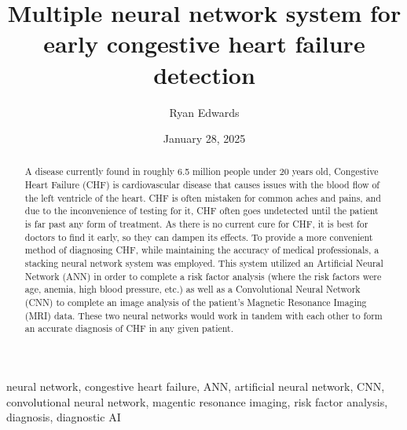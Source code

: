﻿\documentclass[12pt,conference,onecolumn]{IEEEtran}
\title{Multiple neural network system for early congestive heart failure detection}
\author{Ryan Edwards}
\date{January 28, 2025}
\newcommand{\keywords}{neural network, congestive heart failure, ANN, artificial neural network, CNN, convolutional neural network, magentic resonance imaging, risk factor analysis, diagnosis, diagnostic AI}
\begin{document}
\maketitle 

\begin{abstract}
A disease currently found in roughly 6.5 million people under 20 years old, Congestive Heart Failure (CHF) is cardiovascular disease that causes issues with the blood flow of the left ventricle of the heart. CHF is often mistaken for common aches and pains, and due to the inconvenience of testing for it, CHF often goes undetected until the patient is far past any form of treatment. As there is no current cure for CHF, it is best for doctors to find it early, so they can dampen its effects. To provide a more convenient method of diagnosing CHF, while maintaining the accuracy of medical professionals, a stacking neural network system was employed. This system utilized an Artificial Neural Network (ANN) in order to complete a risk factor analysis (where the risk factors were age, anemia, high blood pressure, etc.) as well as a Convolutional Neural Network (CNN) to complete an image analysis of the patient’s Magnetic Resonance Imaging (MRI) data. These two neural networks would work in tandem with each other to form an accurate diagnosis of CHF in any given patient.
\end{abstract}

\begin{IEEEkeywords}
\keywords
\end{IEEEkeywords}
\end{document}
